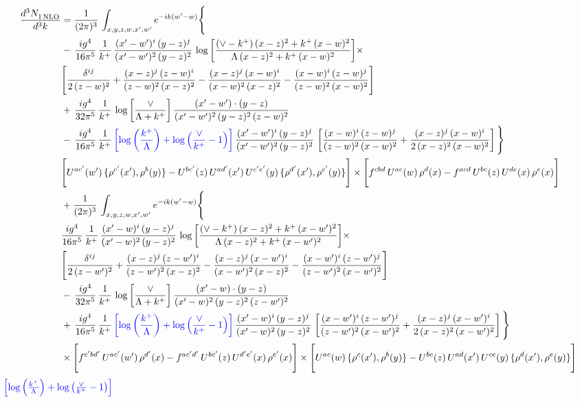 \documentclass[9pt]{article}
\numberwithin{equation}{section}
\begin{document}
\begin{align}
 \frac{d^{3}N_{1\,\rm NLO}^{\rm}}{d^{3}k}  & =    \frac{1}{(2\pi)^{3}}\,\int_{x,y,z,w,x',w^{\prime}} e^{-ik(w^{\prime}-w)}\Bigg\{ \notag \\ & -\, \frac{ig^{4}}{16\pi^{5}}\,\frac{1}{k^{+}}\, \frac{(x'-w')^{i}\,(y-z)^{j}}{(x'-w')^{2}\,(y-z)^{2}}\,\log{\left[\frac{(\vee-k^{+})\,(x-z)^{2}+k^{+}\,(x-w)^{2}}{\Lambda\, (x-z)^{2}+k^{+}\,(x-w)^{2}}\right]}\times\notag \\ &  \Bigg[\frac{\delta^{ij}}{2\,(z-w)^{2}}+\frac{(x-z)^{j}\,(z-w)^{i}}{(z-w)^{2}\,(x-z)^{2}}-\frac{(x-z)^{j}\,(x-w)^{i}}{(x-w)^{2}\,(x-z)^{2}}-\frac{(x-w)^{i}\,(z-w)^{j}}{(z-w)^{2}\,(x-w)^{2}}\Bigg]\notag \\ & +\,\frac{ig^{4}}{32\pi^{5}}\,\frac{1}{k^{+}}\,\log{\left[\frac{\vee}{\Lambda + k^{+}}\right]}\, \frac{(x'-w')\cdot (y-z)}{(x'-w')^{2}\,(y-z)^{2}\,(z-w)^{2}}\notag \\ & -\, \frac{ig^{4}}{16\pi^{5}}\,\frac{1}{k^{+}}\,{\color{blue}\left[\log{\left(\frac{k^{+}}{\Lambda}\right)}+\log{\left(\frac{\vee}{k^{+}}-1\right)}\right]}\,\frac{(x'-w')^{i}\,(y-z)^{j}}{(x'-w')^{2}\,(y-z)^{2}}\,\left[\frac{(x-w)^{i}\,(z-w)^{j}}{(z-w)^{2}\,(x-w)^{2}}+\frac{(x-z)^{j}\,(x-w)^{i}}{2\,(x-z)^{2}\, (x-w)^{2}}\right]\Bigg\} \notag \\ & \Bigg[U^{ac'}(w')\,\{\rho^{c'}(x'),\rho^{b}(y)\}-U^{bc'}(z)\,U^{ad'}(x')\,U^{c'e'}(y)\, \{\rho^{d'}(x'),\rho^{e'}(y)\}\Bigg]\times \Bigg[f^{cbd}\,U^{ac}(w)\,\rho^{d}(x)-f^{acd}\, U^{bc}(z)\,U^{de}(x)\,\rho^{e}(x)\Bigg]\notag \\ & + \frac{1}{(2\pi)^{3}}\,\int_{x,y,z,w,x',w^{\prime}} e^{-ik(w^{\prime}-w)}\Bigg\{ \notag \\ &  \frac{ig^{4}}{16\pi^{5}}\,\frac{1}{k^{+}}\, \frac{(x'-w)^{i}\,(y-z)^{j}}{(x'-w)^{2}\,(y-z)^{2}}\,\log{\left[\frac{(\vee-k^{+})\,(x-z)^{2}+k^{+}\,(x-w')^{2}}{\Lambda\, (x-z)^{2} + k^{+}\,(x-w')^{2}}\right]}\times\notag \\ &  \Bigg[\frac{\delta^{ij}}{2\,(z-w')^{2}}+\frac{(x-z)^{j}\,(z-w')^{i}}{(z-w')^{2}\,(x-z)^{2}}-\frac{(x-z)^{j}\,(x-w')^{i}}{(x-w')^{2}\,(x-z)^{2}}-\frac{(x-w')^{i}\,(z-w')^{j}}{(z-w')^{2}\,(x-w')^{2}}\Bigg]\notag \\ & -\,\frac{ig^{4}}{32\pi^{5}}\,\frac{1}{k^{+}}\,\log{\left[\frac{\vee}{\Lambda + k^{+}}\right]}\, \frac{(x'-w)\cdot (y-z)}{(x'-w)^{2}\,(y-z)^{2}\,(z-w')^{2}}\notag \\ & +\,\frac{ig^{4}}{16\pi^{5}}\,\frac{1}{k^{+}}\,{\color{blue}\left[\log{\left(\frac{k^{+}}{\Lambda}\right)}+\log{\left(\frac{\vee}{k^{+}}-1\right)}\right]}\,\frac{(x'-w)^{i}\,(y-z)^{j}}{(x'-w)^{2}\,(y-z)^{2}}\,\left[\frac{(x-w')^{i}\,(z-w')^{j}}{(z-w')^{2}\,(x-w')^{2}}+\frac{(x-z)^{j}\,(x-w')^{i}}{2\,(x-z)^{2}\, (x-w')^{2}}\right] \Bigg\} \notag \\ & \times\Bigg[f^{c'bd'}\,U^{ac'}(w')\,\rho^{d'}(x)-f^{ac'd'}\, U^{bc'}(z)\,U^{d'e'}(x)\,\rho^{e'}(x)\Bigg] \times \Bigg[U^{ac}(w)\,\{\rho^{c}(x'),\rho^{b}(y)\}-U^{bc}(z)\,U^{ad}(x')\,U^{ce}(y)\, \{\rho^{d}(x'),\rho^{e}(y)\}\Bigg]
\end{align}
${\color{blue}\left[\log{\left(\frac{k^{+}}{\Lambda}\right)}+\log{\left(\frac{\vee}{k^{+}}-1\right)}\right]}$
\end{document}
